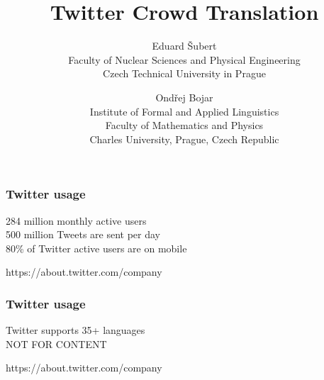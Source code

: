\documentclass[12pt]{beamer}
\title{\textbf{Twitter Crowd Translation}}
\author{
Eduard \v{S}ubert\\
Faculty of Nuclear Sciences and Physical Engineering\\
Czech Technical University in Prague\\
\and
Ond\v{r}ej Bojar\\
Institute of Formal and Applied Linguistics\\
Faculty of Mathematics and Physics\\
Charles University, Prague, Czech Republic
}
\begin{document}
\frame{\titlepage}


\begin{frame}
	\frametitle{Twitter usage}
	\vfill
	\begin{center}
	\textcolor{TCTsilver}{\Large 284 million monthly active users}
	\\[0.7cm]
	\textcolor{TCTsilver}{\Large 500 million Tweets are sent per day}
	\\[0.7cm]
	\textcolor{TCTsilver}{\Large 80\% of Twitter active users are on mobile}
	\end{center}
	\vfill
	\hfill\textcolor{TCTsilver}{https://about.twitter.com/company}
\end{frame}

\begin{frame}
	\frametitle{Twitter usage}
	\vfill
	\begin{center}
	\textcolor{TCTgray}{\Large Twitter supports 35+ languages}
	\uncover<2->
	{\\[0.7cm]\textcolor{TCTgray}{\Huge NOT FOR CONTENT}}
	\end{center}
	\vfill
	\hfill\textcolor{TCTgray}{https://about.twitter.com/company}
\end{frame}

\end{document}
